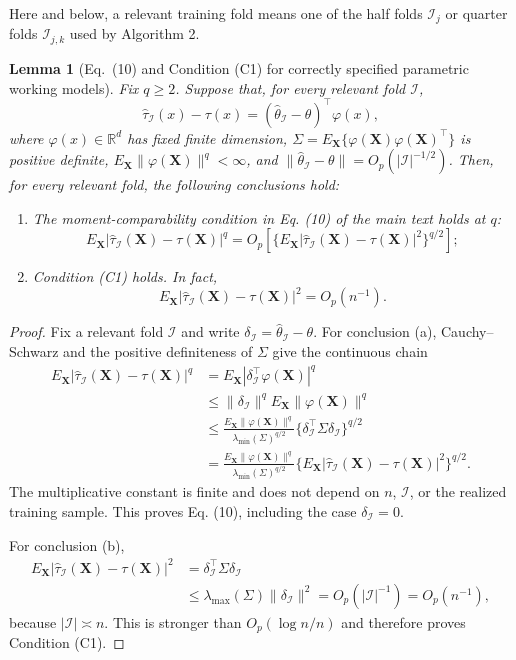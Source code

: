 \documentclass[11pt]{article}
\theoremstyle{referenceplain}
\newtheorem{lemma}{Lemma}[section]
\theoremstyle{referencedefinition}
\theoremstyle{referenceremark}
\begin{document}
Here and below, a relevant training fold means one of the half folds
$\mathcal I_j$ or quarter folds $\mathcal I_{j,k}$ used by Algorithm 2.
\begin{lemma}[Eq.~(10) and Condition (C1) for correctly specified parametric working models]\label{parametric-tuning-conditions}
Fix $q\ge2$. Suppose that, for every relevant fold $\mathcal I$,
\[
\widehat\tau_{\mathcal I}(x)-\tau(x)
=(\widehat\theta_{\mathcal I}-\theta)^\top\varphi(x),
\]
where $\varphi(x)\in\mathbb R^d$ has fixed finite dimension,
$\Sigma=E_{\mathbf X}\{\varphi(\mathbf X)\varphi(\mathbf X)^\top\}$ is positive definite,
$E_{\mathbf X}\|\varphi(\mathbf X)\|^q<\infty$, and
$\|\widehat\theta_{\mathcal I}-\theta\|=O_p(|\mathcal I|^{-1/2})$. Then, for every relevant fold, the following conclusions hold:
\begin{enumerate}
\item[\textup{(a)}] The moment-comparability condition in Eq. (10) of the main text holds at $q$:
\[
E_{\mathbf X}|\widehat\tau_{\mathcal I}(\mathbf X)-\tau(\mathbf X)|^q
=O_p\left[
\{E_{\mathbf X}|\widehat\tau_{\mathcal I}(\mathbf X)-\tau(\mathbf X)|^2\}^{q/2}
\right];
\]
\item[\textup{(b)}] Condition (C1) holds. In fact,
\[
E_{\mathbf X}|\widehat\tau_{\mathcal I}(\mathbf X)-\tau(\mathbf X)|^2=O_p(n^{-1}).
\]
\end{enumerate}
\end{lemma}
\begin{proof}
Fix a relevant fold $\mathcal I$ and write
$\delta_{\mathcal I}=\widehat\theta_{\mathcal I}-\theta$.
For conclusion (a), Cauchy--Schwarz and the positive definiteness of $\Sigma$ give the continuous chain
\begin{align*}
E_{\mathbf X}|\widehat\tau_{\mathcal I}(\mathbf X)-\tau(\mathbf X)|^q
&=E_{\mathbf X}|\delta_{\mathcal I}^\top\varphi(\mathbf X)|^q\\
&\le \|\delta_{\mathcal I}\|^q E_{\mathbf X}\|\varphi(\mathbf X)\|^q\\
&\le
\frac{E_{\mathbf X}\|\varphi(\mathbf X)\|^q}
{\lambda_{\min}(\Sigma)^{q/2}}
\{\delta_{\mathcal I}^\top\Sigma\delta_{\mathcal I}\}^{q/2}\\
&=
\frac{E_{\mathbf X}\|\varphi(\mathbf X)\|^q}
{\lambda_{\min}(\Sigma)^{q/2}}
\{E_{\mathbf X}|\widehat\tau_{\mathcal I}(\mathbf X)-\tau(\mathbf X)|^2\}^{q/2}.
\end{align*}
The multiplicative constant is finite and does not depend on $n$, $\mathcal I$, or the realized training sample. This proves Eq. (10), including the case $\delta_{\mathcal I}=0$.

For conclusion (b),
\begin{align*}
E_{\mathbf X}|\widehat\tau_{\mathcal I}(\mathbf X)-\tau(\mathbf X)|^2
&=\delta_{\mathcal I}^\top\Sigma\delta_{\mathcal I}\\
&\le\lambda_{\max}(\Sigma)\|\delta_{\mathcal I}\|^2
=O_p(|\mathcal I|^{-1})
=O_p(n^{-1}),
\end{align*}
because $|\mathcal I|\asymp n$. This is stronger than $O_p(\log n/n)$ and therefore proves Condition (C1).
\end{proof}
\end{document}
